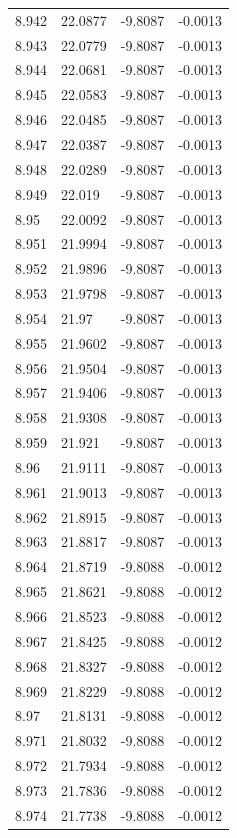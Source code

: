 \begin{tabular}{llll}
8.942 & 22.0877 & -9.8087 & -0.0013 \\
8.943 & 22.0779 & -9.8087 & -0.0013 \\
8.944 & 22.0681 & -9.8087 & -0.0013 \\
8.945 & 22.0583 & -9.8087 & -0.0013 \\
8.946 & 22.0485 & -9.8087 & -0.0013 \\
8.947 & 22.0387 & -9.8087 & -0.0013 \\
8.948 & 22.0289 & -9.8087 & -0.0013 \\
8.949 & 22.019 & -9.8087 & -0.0013 \\
8.95 & 22.0092 & -9.8087 & -0.0013 \\
8.951 & 21.9994 & -9.8087 & -0.0013 \\
8.952 & 21.9896 & -9.8087 & -0.0013 \\
8.953 & 21.9798 & -9.8087 & -0.0013 \\
8.954 & 21.97 & -9.8087 & -0.0013 \\
8.955 & 21.9602 & -9.8087 & -0.0013 \\
8.956 & 21.9504 & -9.8087 & -0.0013 \\
8.957 & 21.9406 & -9.8087 & -0.0013 \\
8.958 & 21.9308 & -9.8087 & -0.0013 \\
8.959 & 21.921 & -9.8087 & -0.0013 \\
8.96 & 21.9111 & -9.8087 & -0.0013 \\
8.961 & 21.9013 & -9.8087 & -0.0013 \\
8.962 & 21.8915 & -9.8087 & -0.0013 \\
8.963 & 21.8817 & -9.8087 & -0.0013 \\
8.964 & 21.8719 & -9.8088 & -0.0012 \\
8.965 & 21.8621 & -9.8088 & -0.0012 \\
8.966 & 21.8523 & -9.8088 & -0.0012 \\
8.967 & 21.8425 & -9.8088 & -0.0012 \\
8.968 & 21.8327 & -9.8088 & -0.0012 \\
8.969 & 21.8229 & -9.8088 & -0.0012 \\
8.97 & 21.8131 & -9.8088 & -0.0012 \\
8.971 & 21.8032 & -9.8088 & -0.0012 \\
8.972 & 21.7934 & -9.8088 & -0.0012 \\
8.973 & 21.7836 & -9.8088 & -0.0012 \\
8.974 & 21.7738 & -9.8088 & -0.0012 \\

\end{tabular}
